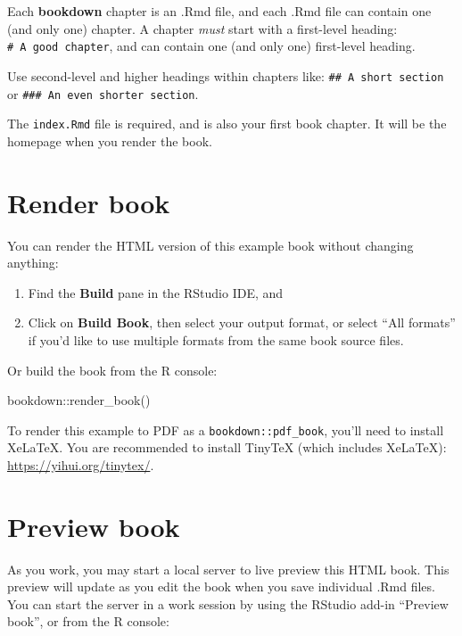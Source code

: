 \documentclass[
]{book}
\newenvironment{Shaded}{\begin{snugshade}}{\end{snugshade}}
\newcommand{\FunctionTok}[1]{\textcolor[rgb]{0.00,0.00,0.00}{#1}}
\newcommand{\NormalTok}[1]{#1}
\newcommand{\SpecialCharTok}[1]{\textcolor[rgb]{0.00,0.00,0.00}{#1}}
\begin{document}
Each \textbf{bookdown} chapter is an .Rmd file, and each .Rmd file can contain one (and only one) chapter. A chapter \emph{must} start with a first-level heading: \texttt{\#\ A\ good\ chapter}, and can contain one (and only one) first-level heading.

Use second-level and higher headings within chapters like: \texttt{\#\#\ A\ short\ section} or \texttt{\#\#\#\ An\ even\ shorter\ section}.

The \texttt{index.Rmd} file is required, and is also your first book chapter. It will be the homepage when you render the book.

\hypertarget{render-book}{%
\section{Render book}\label{render-book}}

You can render the HTML version of this example book without changing anything:

\begin{enumerate}
\def\labelenumi{\arabic{enumi}.}
\item
  Find the \textbf{Build} pane in the RStudio IDE, and
\item
  Click on \textbf{Build Book}, then select your output format, or select ``All formats'' if you'd like to use multiple formats from the same book source files.
\end{enumerate}

Or build the book from the R console:

\begin{Shaded}
\begin{Highlighting}[]
\NormalTok{bookdown}\SpecialCharTok{::}\FunctionTok{render\_book}\NormalTok{()}
\end{Highlighting}
\end{Shaded}

To render this example to PDF as a \texttt{bookdown::pdf\_book}, you'll need to install XeLaTeX. You are recommended to install TinyTeX (which includes XeLaTeX): \url{https://yihui.org/tinytex/}.

\hypertarget{preview-book}{%
\section{Preview book}\label{preview-book}}

As you work, you may start a local server to live preview this HTML book. This preview will update as you edit the book when you save individual .Rmd files. You can start the server in a work session by using the RStudio add-in ``Preview book'', or from the R console:
\end{document}
